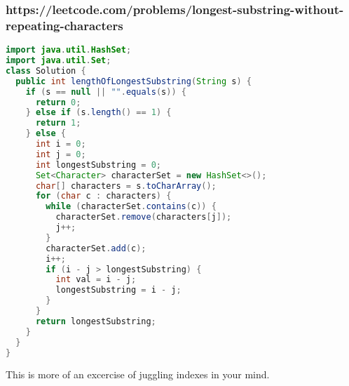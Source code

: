 \documentclass[12pt]{article}
\begin{document}
\subsubsection{https://leetcode.com/problems/longest-substring-without-repeating-characters}
\begin{lstlisting}[language=Java]
import java.util.HashSet;
import java.util.Set;
class Solution {
  public int lengthOfLongestSubstring(String s) {
    if (s == null || "".equals(s)) {
      return 0;
    } else if (s.length() == 1) {
      return 1;
    } else {
      int i = 0;
      int j = 0;
      int longestSubstring = 0;
      Set<Character> characterSet = new HashSet<>();
      char[] characters = s.toCharArray();
      for (char c : characters) {
        while (characterSet.contains(c)) {
          characterSet.remove(characters[j]);
          j++;
        }
        characterSet.add(c);
        i++;
        if (i - j > longestSubstring) {
          int val = i - j;
          longestSubstring = i - j;
        }
      }
      return longestSubstring;
    }
  }
}
\end{lstlisting}

This is more of an excercise of juggling indexes in your mind.
\end{document}
